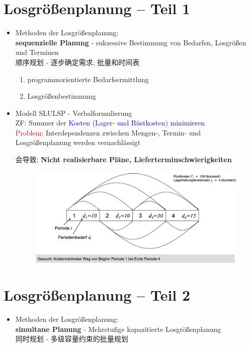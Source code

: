 \documentclass[12pt, letterpaper]{article}
\begin{document}
\begin{CJK*}{UTF8}{gbsn}
\newpage
\section{Losgrößenplanung – Teil 1}
\begin{itemize}
\item Methoden der Losgrößenplanung:\\[1mm]
\textbf{sequenzielle Planung} - sukzessive Bestimmung von Bedarfen, Losgrößen und Terminen\\
顺序规划 - 逐步确定需求, 批量和时间表

\begin{enumerate}
\item programmorientierte Bedarfsermittlung
\item Losgrößenbestimmung
\end{enumerate}

\item Modell SLULSP - Verbalformulierung\\[1mm]
ZF: Summer der \textcolor{blue}{Kosten (Lager- und Rüstkosten) minimieren}\\[1mm]
\textcolor{red}{Problem}: Interdependenzen zwischen Mengen-, Termin- und Losgrößenplanung werden vernachlässigt

会导致: \textbf{Nicht realisierbare Pläne, Lieferterminschwierigkeiten}


\begin{figure}[h!]
  \centering %
  \includegraphics[width=0.9\linewidth]{VL81.png}
\end{figure}
\end{itemize}

\newpage
\section{Losgrößenplanung – Teil 2}
\begin{itemize}
\item Methoden der Losgrößenplanung:\\[1mm]
\textbf{simultane Planung} - Mehrstufige kapazitierte Losgrößenplanung\\
同时规划 - 多级容量约束的批量规划


\end{itemize}
\end{CJK*}
\end{document}
